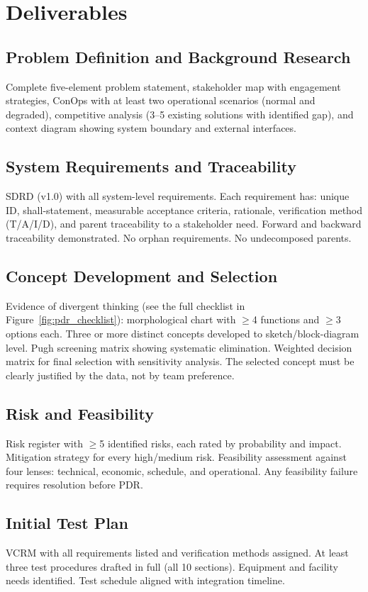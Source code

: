 \section{Deliverables}

\subsection{Problem Definition and Background Research}
Complete five-element problem statement, stakeholder map with engagement strategies, ConOps with at least two operational scenarios (normal and degraded), competitive analysis (3--5 existing solutions with identified gap), and context diagram showing system boundary and external interfaces.

\subsection{System Requirements and Traceability}
SDRD (v1.0) with all system-level requirements. Each requirement has: unique ID, shall-statement, measurable acceptance criteria, rationale, verification method (T/A/I/D), and parent traceability to a stakeholder need. Forward and backward traceability demonstrated. No orphan requirements. No undecomposed parents.

\subsection{Concept Development and Selection}
Evidence of divergent thinking (see the full checklist in Figure~\ref{fig:pdr_checklist}): morphological chart with $\geq$4 functions and $\geq$3 options each. Three or more distinct concepts developed to sketch/block-diagram level. Pugh screening matrix showing systematic elimination. Weighted decision matrix for final selection with sensitivity analysis. The selected concept must be clearly justified by the data, not by team preference.

\subsection{Risk and Feasibility}
Risk register with $\geq$5 identified risks, each rated by probability and impact. Mitigation strategy for every high/medium risk. Feasibility assessment against four lenses: technical, economic, schedule, and operational. Any feasibility failure requires resolution before PDR.

\subsection{Initial Test Plan}
VCRM with all requirements listed and verification methods assigned. At least three test procedures drafted in full (all 10 sections). Equipment and facility needs identified. Test schedule aligned with integration timeline.




